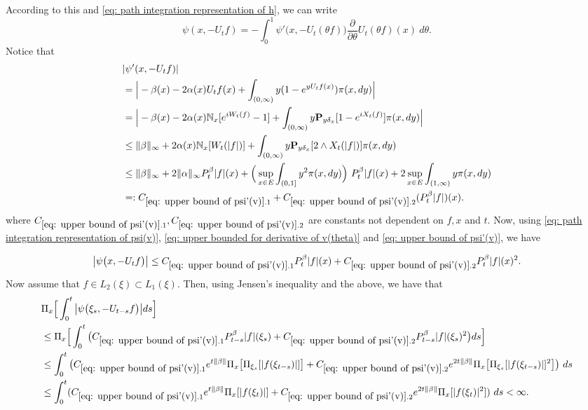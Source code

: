 \documentclass[12pt,oneside,english]{amsart}
\theoremstyle{plain}
\theoremstyle{definition}
\numberwithin{equation}{section}
\begin{document}
    According to this and \eqref{eq: path integration representation of h}, we can write
\begin{equation}
\label{eq: path integration representation of psi(v)}
    \psi(x,-U_tf) = -\int_0^1 \psi'\big(x,-U_t(\theta f)\big) \frac{\partial}{\partial \theta} U_t(\theta f)(x)~d\theta.
\end{equation}
    Notice that
\begin{equation}
\label{eq: upper bound of psi'(v)}
\begin{split}
    &|\psi'(x, -U_tf)|
    \\&= \Big| -\beta(x)- 2\alpha(x) U_tf(x)+ \int_{(0,\infty)} y (1- e^{y U_tf(x)} ) \pi(x,dy)\Big|
    \\&= \Big| - \beta(x)- 2\alpha(x)\mathbb N_x[e^{i W_{t}(f)} - 1]  + \int_{(0,\infty)} y \mathbf P_{y \delta_x}[1-e^{i X_{t}(f)}] \pi(x,dy) \Big|
\\ &\leq \|\beta\|_\infty + 2\alpha(x)\mathbb N_x[W_t(|f|)]+ \int_{(0,\infty)} y\mathbf P_{y\delta_x}[2\wedge X_t(|f|)] \pi(x,dy)
\\ &\leq \|\beta\|_\infty + 2\|\alpha\|_\infty  P^\beta_t |f|(x) + \Big(\sup_{x\in E}\int_{(0,1]}y^2 \pi(x,dy)\Big)~P^\beta_t |f|(x) + 2\sup_{x\in E}\int_{(1,\infty)} y \pi(x,dy)
\\ &=: C_{\ref{eq: upper bound of psi'(v)}.1} + C_{\ref{eq: upper bound of psi'(v)}.2}(P^\beta_t |f|)(x).
\end{split}
\end{equation}
    where $C_{\ref{eq: upper bound of psi'(v)}.1}, C_{\ref{eq: upper bound of psi'(v)}.2}$ are constants not dependent on $f,x$ and $t$.
    Now, using \eqref{eq: path integration representation of psi(v)}, \eqref{eq: upper bounded for derivative of v(theta)} and \eqref{eq: upper bound of psi'(v)}, we have

\begin{align}
\label{eq: upper bound of psi(v)}
    \big|\psi\big(x,-U_tf\big)\big|
    \leq C_{\ref{eq: upper bound of psi'(v)}.1} P^\beta_t |f|(x)+C_{\ref{eq: upper bound of psi'(v)}.2} P^\beta_t |f| (x)^2.
\end{align}
    Now assume that $f \in L_2(\xi) \subset L_1(\xi)$.
    Then, using Jensen's inequality and the above, we have that
\begin{align}
\label{eq: domination of psi(v)}
    &\Pi_x\Big[\int_0^t \big|\psi \big(\xi_s,-U_{t-s}f\big)\big|ds\Big]
    \\&\leq \Pi_x\Big[\int_0^t \big(C_{\ref{eq: upper bound of psi'(v)}.1} P_{t-s}^\beta|f|(\xi_s)+C_{\ref{eq: upper bound of psi'(v)}.2} P_{t-s}^\beta|f|(\xi_s)^2\big)ds\Big]
    \\ &\leq \int_0^t \big(C_{\ref{eq: upper bound of psi'(v)}.1} e^{t\|\beta\|}\Pi_x \big[ \Pi_{\xi_s}[|f(\xi_{t-s})|] \big]+C_{\ref{eq: upper bound of psi'(v)}.2} e^{2t\|\beta\|}\Pi_x \big[ \Pi_{\xi_s}[|f (\xi_{t-s})|]^2 \big]\big)~ds
    \\ &\leq \int_0^t (C_{\ref{eq: upper bound of psi'(v)}.1} e^{t\|\beta\|}\Pi_x [ |f(\xi_{t})|]+C_{\ref{eq: upper bound of psi'(v)}.2}e^{2t\|\beta\|}\Pi_x [ |f (\xi_{t})|^2 ])~ds < \infty.
\end{align}
\end{document}

